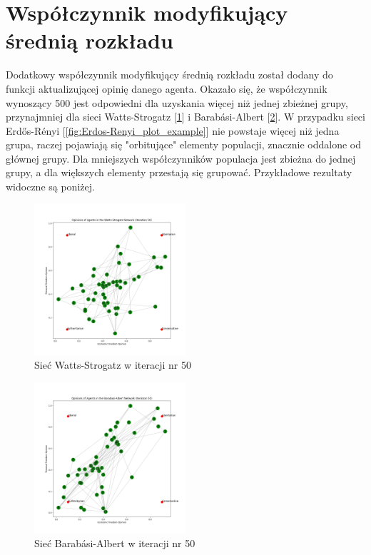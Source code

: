 \section{Współczynnik modyfikujący średnią rozkładu}

Dodatkowy współczynnik modyfikujący średnią rozkładu został dodany do funkcji aktualizującej opinię danego agenta.
Okazało się, że współczynnik wynoszący 500 jest odpowiedni dla uzyskania więcej niż jednej zbieżnej grupy, przynajmniej dla sieci Watts-Strogatz [\ref{fig:Watts-Strogatz_plot_example}] i Barabási-Albert [\ref{fig:Barabási-Albert_plot_example}].
W przypadku sieci Erdős-Rényi [\ref{fig:Erdos-Renyi_plot_example}] nie powstaje więcej niż jedna grupa,
raczej pojawiają się "orbitujące" elementy populacji, znacznie oddalone od głównej grupy.
Dla mniejszych współczynników populacja jest zbieżna do jednej grupy, a dla większych elementy przestają się grupować.
Przykładowe rezultaty widoczne są poniżej.

\begin{figure}
    \centering
    \includegraphics[width=0.5\textwidth]{img/Watts-Strogatz.png}
    \caption{Sieć Watts-Strogatz w iteracji nr 50}
    \label{fig:Watts-Strogatz_plot_example}
\end{figure}

\begin{figure}
    \centering
    \includegraphics[width=0.5\textwidth]{img/Barabasi-Albert.png}
    \caption{Sieć Barabási-Albert w iteracji nr 50}
    \label{fig:Barabási-Albert_plot_example}
\end{figure}

